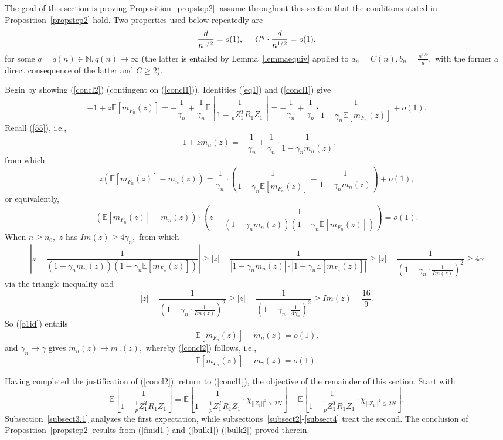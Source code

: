 \documentclass{article}
\numberwithin{equation}{section}
\begin{document}
The goal of this section is proving Proposition~\ref{propstep2}: assume throughout this section that the conditions stated in Proposition~\ref{propstep2} hold. Two properties used below repeatedly are 
\begin{equation}\label{condd}
    \frac{d}{n^{1/2}}=o(1), \hspace{0.5cm} C^{q} \cdot \frac{d}{n^{1/2}}=o(1),
\end{equation}
for some \(q=q(n) \in \mathbb{N}, q(n) \to \infty\) (the latter is entailed by Lemma~\ref{lemmaequiv} applied to \(a_n=C(n),b_n=\frac{n^{1/2}}{d},\) with the former a direct consequence of the latter and \(C \geq 2\)).
\par
Begin by showing (\ref{concl2}) (contingent on (\ref{concl1})). Identities (\ref{eq1}) and (\ref{concl1}) give
\[-1+z\mathbb{E}[m_{F_n}(z)]=-\frac{1}{\gamma_n}+\frac{1}{\gamma_n}\mathbb{E}[\frac{1}{1-\frac{1}{p}Z_1^TR_1Z_1}]=-\frac{1}{\gamma_n}+\frac{1}{\gamma_n} \cdot \frac{1}{1-\gamma_n\mathbb{E}[m_{F_n}(z)]}+o(1).\]
Recall (\ref{55}), i.e., 
\[-1+zm_n(z)=-\frac{1}{\gamma_n}+\frac{1}{\gamma_n} \cdot \frac{1}{1-\gamma_n m_n(z)},\]
from which
\[z(\mathbb{E}[m_{F_n}(z)]-m_n(z))=\frac{1}{\gamma_n} \cdot (\frac{1}{1-\gamma_n \mathbb{E}[m_{F_n}(z)]}-\frac{1}{1-\gamma_n m_n(z)})+o(1),\]
or equivalently,
\begin{equation}\label{o1id}
    (\mathbb{E}[m_{F_n}(z)]-m_n(z)) \cdot (z-\frac{1}{(1-\gamma_n m_{n}(z))(1-\gamma_n \mathbb{E}[m_{F_n}(z)])})=o(1).
\end{equation}
When \(n \geq n_0,\) \(z\) has \(Im(z) \geq 4\gamma_n,\) from which 
\[|z-\frac{1}{(1-\gamma_n m_{n}(z))(1-\gamma_n \mathbb{E}[m_{F_n}(z)])}| \geq |z|-\frac{1}{|1-\gamma_n m_{n}(z)| \cdot |1-\gamma_n \mathbb{E}[m_{F_n}(z)]|} \geq |z|-\frac{1}{(1-\gamma_n \cdot \frac{1}{Im(z)})^2} \geq 4\gamma\]
via the triangle inequality and
\[|z|-\frac{1}{(1-\gamma_n \cdot \frac{1}{Im(z)})^2} \geq |z|-\frac{1}{(1-\gamma_n \cdot \frac{1}{4\gamma_n})^2} \geq Im(z)-\frac{16}{9}.\]
So (\ref{o1id}) entails
\[\mathbb{E}[m_{F_n}(z)]-m_n(z)=o(1).\]
and \(\gamma_n \to \gamma\) gives \(m_n(z) \to m_\gamma(z),\) whereby (\ref{concl2}) follows, i.e.,
\[\mathbb{E}[m_{F_n}(z)]-m_\gamma(z)=o(1).\]
\par
Having completed the justification of (\ref{concl2}), return to (\ref{concl1}), the objective of the remainder of this section. Start with
\[\mathbb{E}[\frac{1}{1-\frac{1}{p}Z_1^TR_1Z_1}]=\mathbb{E}[\frac{1}{1-\frac{1}{p}Z_1^TR_1Z_1}\cdot \chi_{||Z_1||^2>2N}]+\mathbb{E}[\frac{1}{1-\frac{1}{p}Z_1^TR_1Z_1}\cdot \chi_{||Z_1||^2 \leq 2N}].\]
Subsection~\ref{subsect3.1} analyzes the first expectation, while subsections~\ref{subsect2}-\ref{subsect4} %
treat the second. The conclusion of Proposition~\ref{propstep2} results from (\ref{finid1}) and (\ref{bulk1})-(\ref{bulk2}) proved therein.
\end{document}
